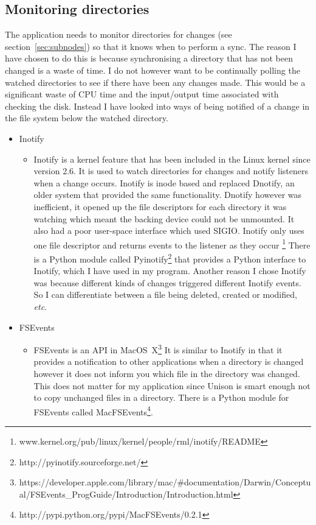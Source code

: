 \documentclass[12pt]{article}
\begin{document}
\subsection{Monitoring directories}
The application needs to monitor directories for changes
(see section~\ref{sec:subnodes})
so that it knows when to perform a sync. The reason I have
chosen to do this is because synchronising a directory that
has not been changed is a waste of time. I do not
however want to be continually polling the watched
directories to see if there have been any changes made.
This would be a significant waste of CPU time and the input/output
time associated with checking the disk. Instead
I have looked into ways of being notified of a
change in the file system below the watched directory.
\begin{itemize}
    \item Inotify
        \begin{itemize}
        \item Inotify is a kernel feature that has been
        included in the Linux kernel since version 2.6.
        It is used to watch directories for changes
        and notify listeners when a change occurs. Inotify
        is inode based and replaced Dnotify, an older system
        that provided the same functionality. Dnotify however was
        inefficient, it opened up the file descriptors for
        each directory it was watching which meant the backing
        device could not be unmounted. 
        It also had a poor
        user-space interface which used SIGIO. Inotify only
        uses one file descriptor and returns events to the
        listener as they occur
        \footnote{www.kernel.org/pub/linux/kernel/people/rml/inotify/README}
        There is a Python module
        called Pyinotify\footnote{http://pyinotify.sourceforge.net/}
        that provides a Python interface
        to Inotify, which I have used in my program.
        Another reason I chose Inotify was because different kinds
        of changes triggered different Inotify events. So I
        can differentiate between a file being deleted, created
        or modified, \emph{etc}.
        \end{itemize}

    \item FSEvents
        \begin{itemize}
        \item FSEvents is an API in 
        MacOS~X\footnote{https://developer.apple.com/library/mac/\#documentation/Darwin/Conceptual/FSEvents\_ProgGuide/Introduction/Introduction.html}
        It is similar
        to Inotify in that it provides a notification to other
        applications when a directory is changed however
        it does not inform you which file in the directory
        was changed. This does not matter for my
        application since Unison is smart enough not to copy
        unchanged files in a directory. There is a Python module
        for FSEvents called
        MacFSEvents\footnote{http://pypi.python.org/pypi/MacFSEvents/0.2.1}. 
        

\end{itemize}
\end{itemize}
\end{document}
